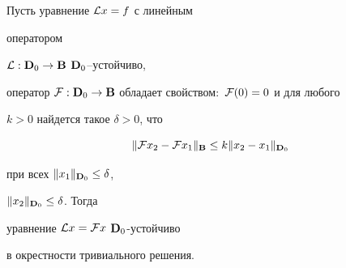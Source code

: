 \begin{thm}


Пусть уравнение ${\cal L}x=f$ с линейным


оператором


${\cal L}:{\bold {D}}_0\to{\bold {B}}$\; ${\bold {D}}_0$--устойчиво,


оператор ${\cal F}:\spc{D}_0\to\spc{B}$ обладает свойством$:$ ${\cal


F}(0)=0$ и для любого


$k>0$ найдется такое $\delta>0$, что


\begin{equation}


\|{\cal F}x_2-{\cal F}x_1\|_{\bold B}\le


k\|x_2-x_1\|_{\bold{D}_0}


\end{equation}


при всех $\|x_1\|_{\bold{D}_0}\le\delta$,


$\|x_2\|_{\bold{D}_0}\le\delta$. Тогда


уравнение ${\cal L}x={\cal F}x$\; $\bold {D}_0$-устойчиво


в окрестности тривиального решения.


\end{thm}





